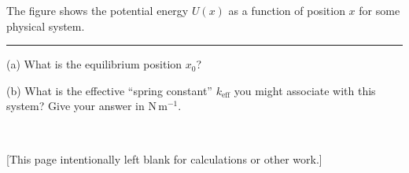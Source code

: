 \documentclass[12pt]{article}
\begin{document}
The figure shows the potential energy $U(x)$ as a function of position
$x$ for some physical system.
\\ \rule{0.2\textwidth}{0pt}

(a) What is the equilibrium position $x_0$?

\vfill

(b) What is the effective ``spring constant'' $k_\mathrm{eff}$ you
might associate with this system?  Give your answer in
$\mathrm{N\,m^{-1}}$.

\vfill ~

\clearpage

[This page intentionally left blank for calculations or other work.]
\end{document}
